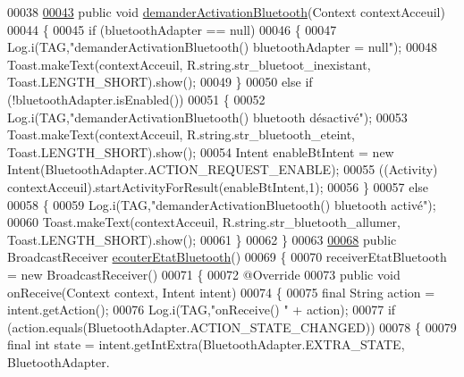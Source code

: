 \begin{DoxyCode}
00038 
\hyperlink{classcom_1_1lasalle_1_1io__trucks_1_1_communication_aba4889871694f97fb1897f9a5b0979f4}{00043}     \textcolor{keyword}{public} \textcolor{keywordtype}{void} \hyperlink{classcom_1_1lasalle_1_1io__trucks_1_1_communication_aba4889871694f97fb1897f9a5b0979f4}{demanderActivationBluetooth}(Context contextAcceuil)
00044     \{
00045         \textcolor{keywordflow}{if} (bluetoothAdapter == null)
00046         \{
00047             Log.i(TAG,\textcolor{stringliteral}{"demanderActivationBluetooth() bluetoothAdapter = null"});
00048             Toast.makeText(contextAcceuil, R.string.str\_bluetoot\_inexistant, Toast.LENGTH\_SHORT).show();
00049         \}
00050         \textcolor{keywordflow}{else} \textcolor{keywordflow}{if} (!bluetoothAdapter.isEnabled())
00051         \{
00052             Log.i(TAG,\textcolor{stringliteral}{"demanderActivationBluetooth() bluetooth désactivé"});
00053             Toast.makeText(contextAcceuil, R.string.str\_bluetooth\_eteint, Toast.LENGTH\_SHORT).show();
00054             Intent enableBtIntent = \textcolor{keyword}{new} Intent(BluetoothAdapter.ACTION\_REQUEST\_ENABLE);
00055             ((Activity) contextAcceuil).startActivityForResult(enableBtIntent,1);
00056         \}
00057         \textcolor{keywordflow}{else}
00058         \{
00059             Log.i(TAG,\textcolor{stringliteral}{"demanderActivationBluetooth() bluetooth activé"});
00060             Toast.makeText(contextAcceuil, R.string.str\_bluetooth\_allumer, Toast.LENGTH\_SHORT).show();
00061         \}
00062     \}
00063 
\hyperlink{classcom_1_1lasalle_1_1io__trucks_1_1_communication_aee896ab782ae245bdb1177d3d80ba193}{00068}     \textcolor{keyword}{public} BroadcastReceiver \hyperlink{classcom_1_1lasalle_1_1io__trucks_1_1_communication_aee896ab782ae245bdb1177d3d80ba193}{ecouterEtatBluetooth}()
00069     \{
00070         receiverEtatBluetooth = \textcolor{keyword}{new} BroadcastReceiver()
00071         \{
00072             @Override
00073             \textcolor{keyword}{public} \textcolor{keywordtype}{void} onReceive(Context context, Intent intent)
00074             \{
00075                 \textcolor{keyword}{final} String action = intent.getAction();
00076                 Log.i(TAG,\textcolor{stringliteral}{"onReceive() "} + action);
00077                 \textcolor{keywordflow}{if} (action.equals(BluetoothAdapter.ACTION\_STATE\_CHANGED))
00078                 \{
00079                     \textcolor{keyword}{final} \textcolor{keywordtype}{int} state = intent.getIntExtra(BluetoothAdapter.EXTRA\_STATE, BluetoothAdapter.

\end{DoxyCode}
